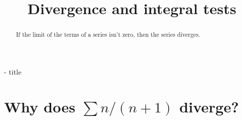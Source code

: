 \documentclass{ximera}
\title{Divergence and integral tests}
\begin{document}
\begin{abstract}
  If the limit of the terms of a series isn't zero, then the series diverges.
\end{abstract}

\maketitle



- title

\section{Why does $\sum n/(n+1)$ diverge?}

\end{document}
